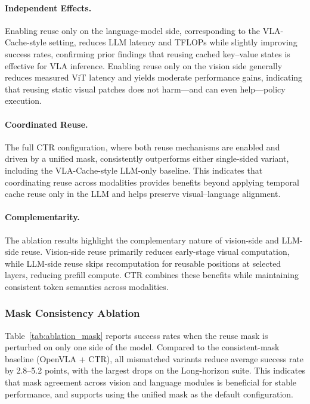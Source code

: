 \documentclass[11pt]{article}
\begin{document}
\paragraph{Independent Effects.}
Enabling reuse only on the language-model side, corresponding to the VLA-Cache-style setting, reduces LLM latency and TFLOPs while slightly improving success rates, confirming prior findings that reusing cached key--value states is effective for VLA inference. Enabling reuse only on the vision side generally reduces measured ViT latency and yields moderate performance gains, indicating that reusing static visual patches does not harm—and can even help—policy execution.

\paragraph{Coordinated Reuse.}
The full CTR configuration, where both reuse mechanisms are enabled and driven by a unified mask, consistently outperforms either single-sided variant, including the VLA-Cache-style LLM-only baseline. This indicates that coordinating reuse across modalities provides benefits beyond applying temporal cache reuse only in the LLM and helps preserve visual--language alignment.

\paragraph{Complementarity.}
The ablation results highlight the complementary nature of vision-side and LLM-side reuse. Vision-side reuse primarily reduces early-stage visual computation, while LLM-side reuse skips recomputation for reusable positions at selected layers, reducing prefill compute. CTR combines these benefits while maintaining consistent token semantics across modalities.

\subsubsection{Mask Consistency Ablation}
Table~\ref{tab:ablation_mask} reports success rates when the reuse mask is perturbed on only one side of the model. Compared to the consistent-mask baseline (OpenVLA + CTR), all mismatched variants reduce average success rate by 2.8--5.2 points, with the largest drops on the Long-horizon suite. This indicates that mask agreement across vision and language modules is beneficial for stable performance, and supports using the unified mask as the default configuration.
\end{document}
